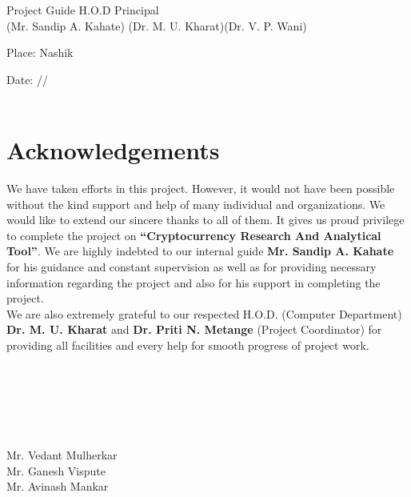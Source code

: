 \documentclass[openany,12pt]{report}
\begin{document}
\hspace{0.1in} Project Guide  \hspace{1.5in}H.O.D \hspace{0.9in} Principal  \\
\hspace{4.6in} (Mr. Sandip A. Kahate) \hspace{0.6in}(Dr. M. U. Kharat)\hspace{0.4in}(Dr. V. P. Wani)\\

\vspace{0.1in}

Place: Nashik

Date: \hspace{0.2in}/\hspace{0.3in}/   \\
\\
\newpage {}
\chapter*{Acknowledgements}

We have taken efforts in this project. However, it would not have been possible without the kind support and help of many individual and organizations. We would like to extend our sincere thanks to all of them. It gives us proud privilege to complete the project on \textbf{ ``Cryptocurrency Research And Analytical Tool''}. We are highly indebted to our internal guide \textbf{Mr. Sandip A. Kahate} for his guidance and constant supervision as well as for providing necessary information regarding the project and also for his support in completing the project.\\
\hspace*{0.5in}We are also extremely grateful to our respected H.O.D. (Computer Department) \textbf{Dr. M. U. Kharat}  and  \textbf{Dr. Priti N. Metange} (Project Coordinator) for providing all facilities and every help for smooth progress of project work.\\
\\
\\
\\
\\
\\
\\
\hspace*{4.0in} Mr. Vedant Mulherkar\\
\hspace*{4.0in} Mr. Ganesh Vispute \\
\hspace*{4.0in} Mr. Avinash Mankar
\\
\\
\\
\\
\\
\\
\\
\end{document}
